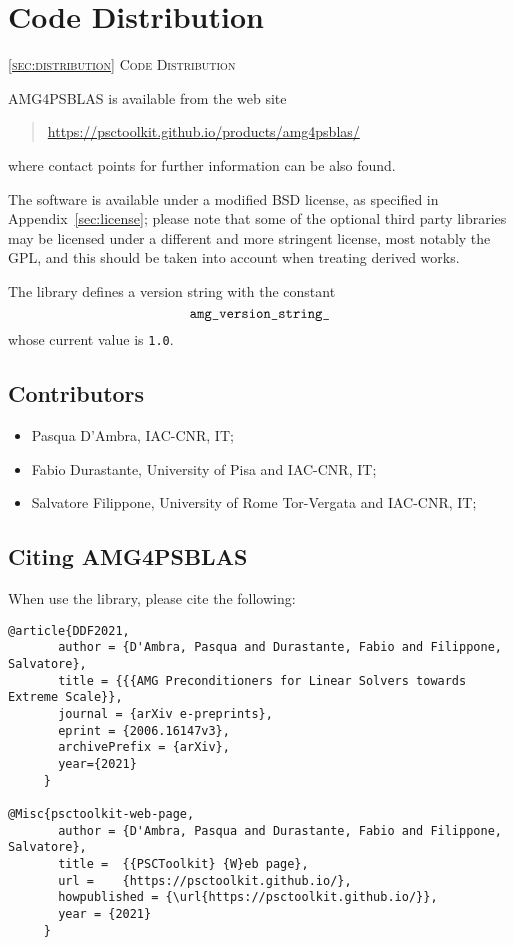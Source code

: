 \section{Code Distribution\label{sec:distribution}}
         {\textsc{\ref{sec:distribution} Code Distribution}}

\noindent
AMG4PSBLAS is available from the web site
\begin{quotation}
\href{https://psctoolkit.github.io/products/amg4psblas/}{https://psctoolkit.github.io/products/amg4psblas/}
\end{quotation}
where contact points for further information can be also found.

The software is available under a modified BSD license, as specified
in Appendix~\ref{sec:license}; please note that some of the optional
third party libraries may be licensed under a different and more
stringent license, most notably the GPL, and this should be taken into
account when treating derived works.

The library defines a version string with the
constant
\[ \verb|amg_version_string_|\]
whose current value is \verb|1.0|.

\subsection*{Contributors}
\begin{itemize}
\item Pasqua D'Ambra, IAC-CNR, IT;			
\item Fabio Durastante, University of Pisa and IAC-CNR, IT;
\item Salvatore  Filippone, University of Rome Tor-Vergata and IAC-CNR, IT;				
\end{itemize}

\subsection*{Citing AMG4PSBLAS}
When use the library, please cite the following:

\begin{verbatim}
@article{DDF2021,
       author = {D'Ambra, Pasqua and Durastante, Fabio and Filippone, Salvatore},
       title = {{{AMG Preconditioners for Linear Solvers towards Extreme Scale}},
       journal = {arXiv e-preprints},
       eprint = {2006.16147v3},
       archivePrefix = {arXiv},
       year={2021}
     }

@Misc{psctoolkit-web-page,
       author = {D'Ambra, Pasqua and Durastante, Fabio and Filippone, Salvatore},
       title =  {{PSCToolkit} {W}eb page},
       url =    {https://psctoolkit.github.io/},
       howpublished = {\url{https://psctoolkit.github.io/}},
       year = {2021}
     }
\end{verbatim}